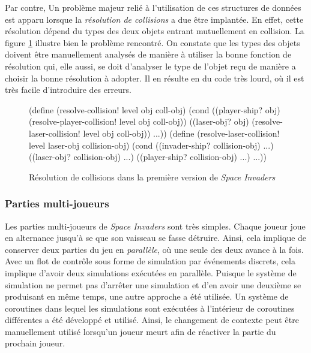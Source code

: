 \documentclass[12pt,twoside,letterpaper,francais]{book}
\newcommand{\si}{{\textit{Space Invaders }}}
\begin{document}
Par contre, Un problème majeur relié à l'utilisation de ces structures
de données est apparu lorsque la \emph{résolution de collisions} a due
être implantée. En effet, cette résolution dépend du types des deux
objets entrant mutuellement en collision. La figure
\ref{Exp:si1-col-res} illustre bien le problème rencontré. On constate
que les types des objets doivent être manuellement analysés de manière
à utiliser la bonne fonction de résolution qui, elle aussi, se doit
d'analyser le type de l'objet reçu de manière a choisir la bonne
résolution à adopter. Il en résulte en du code très lourd, où il est
très facile d'introduire des erreurs.\\

\begin{figure}[htb!]
  \begin{schemecode}
(define (resolve-collision! level obj coll-obj)
  (cond
   ((player-ship? obj) (resolve-player-collision! level obj coll-obj))
   ((laser-obj? obj) (resolve-laser-collision! level obj coll-obj))
   ...))
(define (resolve-laser-collision! level laser-obj collision-obj)
  (cond ((invader-ship? collision-obj) ...)
        ((laser-obj? collision-obj) ...)
        ((player-ship? collision-obj) ...)
        ...))
  \end{schemecode}
  \caption{Résolution de collisions dans la première version de \si}
  \label{Exp:si1-col-res}
\end{figure}


\FloatBarrier
\subsubsection{Parties multi-joueurs}
Les parties multi-joueurs de \si sont très simples. Chaque joueur joue
en alternance jusqu'à se que son vaisseau se fasse détruire. Ainsi,
cela implique de conserver deux parties du jeu en \emph{parallèle}, où
une seule des deux avance à la fois. Avec un flot de contrôle sous
forme de simulation par événements discrets, cela implique d'avoir
deux simulations exécutées en parallèle. Puisque le système de
simulation ne permet pas d'arrêter une simulation et d'en avoir une
deuxième se produisant en même temps, une autre approche a été
utilisée. Un système de coroutines dans lequel les simulations sont
exécutées à l'intérieur de coroutines différentes a été développé et
utilisé. Ainsi, le changement de contexte peut être manuellement
utilisé lorsqu'un joueur meurt afin de réactiver la partie du prochain
joueur.
\end{document}
